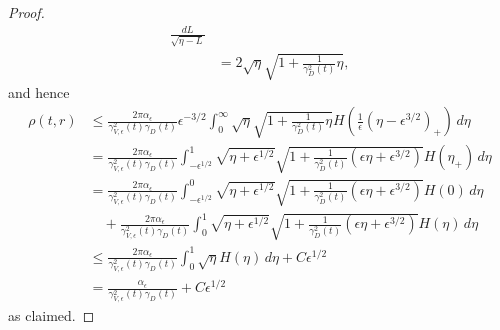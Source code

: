 \documentclass[10pt,a4paper]{amsart}
\begin{document}
\begin{proof}
\begin{align*}
    \frac{dL}{\sqrt{\eta-L}}\\
    &=
    2  \sqrt{\eta} \sqrt{1+\frac{1}{\gamma_D^2(t)} \eta},
  \end{align*}
  and hence
  \begin{align*}
    \rho(t,r)
    &
    \leq \frac{2 \pi \alpha_\epsilon }{\gamma^2_{V,\epsilon}(t) \gamma_D(t)}
    \epsilon^{-3/2}
    \int_0^\infty \sqrt{\eta} \sqrt{1+\frac{1}{\gamma_D^2(t)} \eta}
    H\left(\frac{1}{\epsilon} \left(\eta -\epsilon^{3/2}\right)_+ \right)
    \, d\eta\\
    &
    = \frac{2 \pi \alpha_\epsilon}{\gamma^2_{V,\epsilon}(t) \gamma_D(t)}
    \int_{-\epsilon^{1/2}}^1 \sqrt{\eta+\epsilon^{1/2}}
    \sqrt{1+\frac{1}{\gamma_D^2(t)} (\epsilon \eta+\epsilon^{3/2})}
    H\left(\eta_+ \right)\, d\eta\\
    &
    = \frac{2 \pi \alpha_\epsilon}{\gamma^2_{V,\epsilon}(t) \gamma_D(t)}
    \int_{-\epsilon^{1/2}}^0 \sqrt{\eta+\epsilon^{1/2}}
    \sqrt{1+\frac{1}{\gamma_D^2(t)} (\epsilon \eta+\epsilon^{3/2})}
    H (0)\, d\eta\\
    &
    \quad {}+ \frac{2 \pi \alpha_\epsilon}{\gamma^2_{V,\epsilon}(t) \gamma_D(t)}
    \int_0^1 \sqrt{\eta+\epsilon^{1/2}}
    \sqrt{1+\frac{1}{\gamma_D^2(t)} (\epsilon \eta+\epsilon^{3/2})}
    H(\eta)\, d\eta\\
    &
    \leq
    \frac{2 \pi \alpha_\epsilon}{\gamma^2_{V,\epsilon}(t) \gamma_D(t)}
    \int_0^1 \sqrt{\eta} H(\eta)\, d\eta + C \epsilon^{1/2}\\
    &
    = \frac{\alpha_\epsilon}{\gamma^2_{V,\epsilon}(t) \gamma_D(t)} + C \epsilon^{1/2}
  \end{align*}
  as claimed.


\end{proof}
\end{document}
